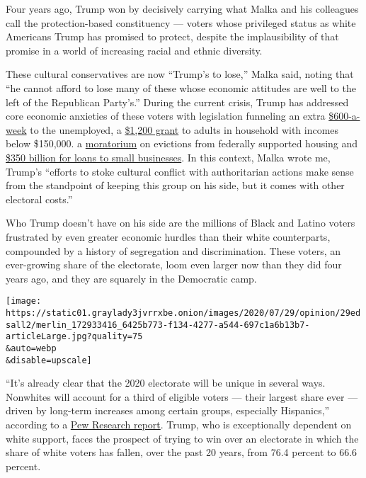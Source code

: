 Four years ago, Trump won by decisively carrying what Malka and his
colleagues call the protection-based constituency --- voters whose
privileged status as white Americans Trump has promised to protect,
despite the implausibility of that promise in a world of increasing
racial and ethnic diversity.

These cultural conservatives are now ``Trump's to lose,'' Malka said,
noting that ``he cannot afford to lose many of these whose economic
attitudes are well to the left of the Republican Party's.'' During the
current crisis, Trump has addressed core economic anxieties of these
voters with legislation funneling an extra
\href{https://fortune.com/2020/07/27/unemployment-600-extra-benefits-extension-cut-republican-plan-stimulus-package-bill-200-per-week-how-much-update/}{\$600-a-week}
to the unemployed, a
\href{https://www.marketplace.org/2020/03/19/white-house-may-send-out-1000-checks-to-adults-500-to-children/}{\$1,200
grant} to adults in household with incomes below \$150,000. a
\href{https://nlihc.org/federal-moratoriums}{moratorium} on evictions
from federally supported housing and
\href{https://smallbusiness.house.gov/uploadedfiles/cares_flow_chart_edit.pdf}{\$350
billion for loans to small businesses}. In this context, Malka wrote me,
Trump's ``efforts to stoke cultural conflict with authoritarian actions
make sense from the standpoint of keeping this group on his side, but it
comes with other electoral costs.''

Who Trump doesn't have on his side are the millions of Black and Latino
voters frustrated by even greater economic hurdles than their white
counterparts, compounded by a history of segregation and discrimination.
These voters, an ever-growing share of the electorate, loom even larger
now than they did four years ago, and they are squarely in the
Democratic camp.

\texttt{[image: https://static01.graylady3jvrrxbe.onion/images/2020/07/29/opinion/29edsall2/merlin\_172933416\_6425b773-f134-4277-a544-697c1a6b13b7-articleLarge.jpg?quality=75\\\&auto=webp\\\&disable=upscale]}

``It's already clear that the 2020 electorate will be unique in several
ways. Nonwhites will account for a third of eligible voters --- their
largest share ever --- driven by long-term increases among certain
groups, especially Hispanics,'' according to a
\href{https://www.pewsocialtrends.org/essay/an-early-look-at-the-2020-electorate/}{Pew
Research report}. Trump, who is exceptionally dependent on white
support, faces the prospect of trying to win over an electorate in which
the share of white voters has fallen, over the past 20 years, from 76.4
percent to 66.6 percent.


